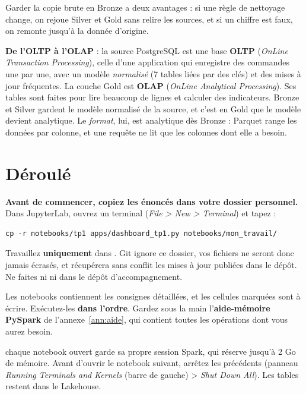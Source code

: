 Garder la copie brute en Bronze a deux avantages : si une règle de nettoyage change, on rejoue
Silver et Gold sans relire les sources, et si un chiffre est faux, on remonte jusqu'à la donnée d'origine.

\textbf{De l'OLTP à l'OLAP} : la source PostgreSQL est une base \textbf{OLTP} (\emph{OnLine
Transaction Processing}), celle d'une application qui enregistre des commandes une par une, avec
un modèle \emph{normalisé} (7 tables liées par des clés) et des mises à jour fréquentes. La couche
Gold est \textbf{OLAP} (\emph{OnLine Analytical Processing}). Ses tables sont faites pour lire beaucoup
de lignes et calculer des indicateurs. Bronze et Silver gardent le modèle normalisé de la source,
et c'est en Gold que le modèle devient analytique. Le \emph{format}, lui, est analytique dès Bronze :
Parquet range les données par colonne, et une requête ne lit que les colonnes dont elle a besoin.

\section{Déroulé}

\textbf{Avant de commencer, copiez les énoncés dans votre dossier personnel.} Dans JupyterLab, ouvrez un
terminal (\emph{File > New > Terminal}) et tapez :
\begin{lstlisting}[style=shell]
cp -r notebooks/tp1 apps/dashboard_tp1.py notebooks/mon_travail/
\end{lstlisting}
Travaillez \textbf{uniquement} dans . Git ignore ce dossier, vos fichiers ne
seront donc jamais écrasés, et  récupérera sans conflit les mises à jour publiées dans le dépôt.
Ne faites ni  ni  dans le dépôt d'accompagnement.

Les notebooks contiennent les consignes détaillées, et les cellules marquées  sont à
écrire. Exécutez-les \textbf{dans l'ordre}.
Gardez sous la main l'\textbf{aide-mémoire PySpark} de l'annexe~\ref{ann:aide}, qui contient toutes
les opérations dont vous aurez besoin.


\begin{attention}
chaque notebook ouvert garde sa propre session Spark,
qui réserve jusqu'à 2 Go de mémoire. Avant d'ouvrir le notebook suivant, arrêtez les précédents
(panneau \emph{Running Terminals and Kernels} (barre de gauche) > \emph{Shut Down All}).
Les tables restent dans le Lakehouse.
\end{attention}


